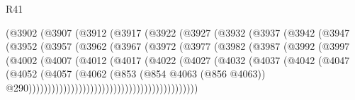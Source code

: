 \begin{lexlean}{R41}
\begin{coremodule}
                        (@3902
                          (@3907
                            (@3912
                              (@3917
                                (@3922
                                  (@3927
                                    (@3932
                                      (@3937
                                        (@3942
                                          (@3947
                                            (@3952
                                              (@3957
                                                (@3962
                                                  (@3967
                                                    (@3972
                                                      (@3977
                                                        (@3982
                                                          (@3987
                                                            (@3992
                                                              (@3997
                                                                (@4002
                                                                  (@4007
                                                                    (@4012
                                                                      (@4017
                                                                        (@4022
                                                                          (@4027
                                                                            (@4032
                                                                              (@4037
                                                                                (@4042
                                                                                  (@4047
                                                                                    (@4052
                                                                                      (@4057
                                                                                        (@4062
                                                                                          (@853
                                                                                            (@854
                                                                                              @4063
                                                                                              (@856
                                                                                                @4063))
                                                                                            @290))))))))))))))))))))))))))))))))))))))))))))

\end{coremodule}
\end{lexlean}
